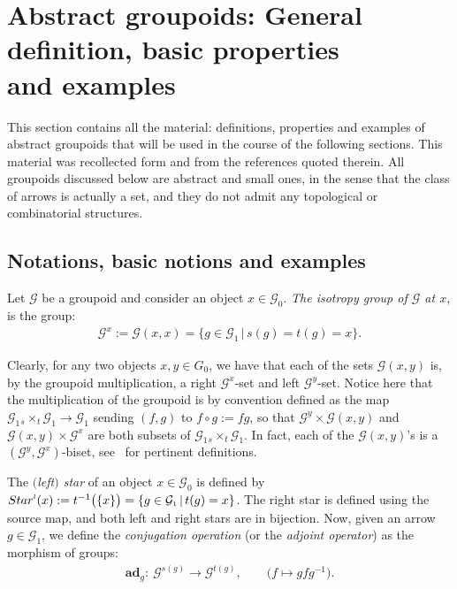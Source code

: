 \documentclass[11pt]{article}
\numberwithin{equation}{section}
\newcommand{\bd}[1]{\boldsymbol{#1}}
\newcommand{\Go}{\cG_{\Sscript{0}}}
\newcommand{\Ga}{\cG_{\Sscript{1}}}
\newcommand{\Starl}[1]{{{\rm Star}}^{\Sscript{l}}(#1)}
\newcommand{\Ad}[1]{{\bd{ad}}_{\Sscript{#1}}}
\newcommand{\cG}{{\mathcal G}}
\newcommand{\Sscript}[1]{\scriptscriptstyle{#1}}
\newcommand{\due}[3]{{}_{{#2 }} {#1}_{{ #3}} }
\begin{document}
\setcounter{section}{1}
\setcounter{subsection}{3}
\setcounter{subsubsection}{0}
\setcounter{Theorem}{2}
\setcounter{equation}{1}
\section[Abstract groupoids: General definition, basic properties and examples]{Abstract groupoids: General definition, basic properties\\ and examples}\label{sec:Grpd}
This section contains all the material: definitions, properties and examples of abstract groupoids that will be used in the course of the following sections. This material was recollected form \cite{ElKaoutit:2015, Kaoutit/Kowalzig:14, Kaoutit/Spinosa:2018} and from the references quoted therein. All groupoids discussed below are abstract and small ones, in the sense that the class of arrows is actually a set, and they do not admit any topological or combinatorial structures.

\subsection{Notations, basic notions and examples}\label{ssec:basic}Let $\cG$ be a groupoid and consider an object $x \in \Go$. \emph{The isotropy group of $\cG$ at $x$}, is the group:
\begin{gather}\label{Eq:isotropy}
\cG^{\Sscript{x}}:=\cG(x,x) = \big\{ g \in \cG_{\Sscript{1}}\,|\, s(g)=t(g)=x \big\}.
\end{gather}

Clearly, for any two objects $x, y \in G_{\Sscript{0}}$, we have that each of the sets $\cG(x,y)$ is, by the groupoid multiplication, a right $\cG^{\Sscript{x}}$-set and left $\cG^{\Sscript{y}}$-set. Notice here that the multiplication of the groupoid is by convention defined as the map $\cG_{\Sscript{1}} \due \times {\Sscript{{s}}} { \Sscript{{t}}} \cG_{\Sscript{1}} \to \cG_{\Sscript{1}}$ sending $(f,g)$ to $f \circ g:=fg$, so that $\mathcal{G}^{y} \times \mathcal{G}(x,y)$ and $\mathcal{G}(x,y) \times \mathcal{G}^{x} $ are both subsets of $\cG_{\Sscript{1}} \due \times {\Sscript{{s}}} { \Sscript{{t}}} \cG_{\Sscript{1}} $. In fact, each of the $\cG(x,y)$'s is a $(\cG^{\Sscript{y}}, \cG^{\Sscript{x}})$-biset, see~\cite{Bouc:2010} for pertinent definitions.

The \emph{$($left$)$ star} of an object $x \in \Go$ is defined by $\Starl{x}:=t^{-1}\big( \{ x\}\big)=\{ g \in \Ga \,|\, t(g)=x \}$. The right star is defined using the source map, and both left and right stars are in bijection. Now, given an arrow $g \in \Ga$, we define the \emph{conjugation operation} (or the \emph{adjoint operator}) as the morphism of groups:
\begin{gather}\label{Eq:Ad}
\Ad{g}\colon \ \cG^{\Sscript{s(g)}} \longrightarrow \cG^{\Sscript{t(g)}}, \qquad \big( f \longmapsto gfg^{-1} \big).
\end{gather}
\end{document}
